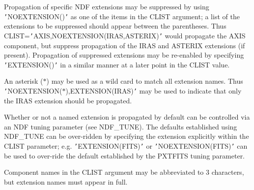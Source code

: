 \documentclass[twoside,11pt,nolof]{starlink}
\begin{document}
{{{         \sstitem
         Propagation of specific NDF extensions may be suppressed by
         using \texttt{'}NOEXTENSION()\texttt{'} as one of the items in the CLIST argument;
         a list of the extensions to be suppressed should appear between
         the parentheses. Thus CLIST=\texttt{'}AXIS,NOEXTENSION(IRAS,ASTERIX)\texttt{'}
         would propagate the AXIS component, but suppress propagation of
         the IRAS and ASTERIX extensions (if present). Propagation of
         suppressed extensions may be re-enabled by specifying
         \texttt{'}EXTENSION()\texttt{'} in a similar manner at a later point in the CLIST
         value.

         \sstitem An asterisk ($*$) may be used as a wild card to match all
         extension names. Thus \texttt{'}NOEXTENSION($*$),EXTENSION(IRAS)\texttt{'}
         may be used to indicate that only the IRAS extension should be
         propagated.

         \sstitem
         Whether or not a named extension is propagated by default can be
         controlled via an NDF tuning parameter (see NDF\_TUNE). The defaults
         established using NDF\_TUNE can be over-ridden by specifying the
         extension explicitly within the CLIST parameter; e.g.
         \texttt{'}EXTENSION(FITS)\texttt{'} or \texttt{'}NOEXTENSION(FITS)\texttt{'} can be used to over-ride
         the default established by the PXTFITS tuning parameter.

         \sstitem
         Component names in the CLIST argument may be abbreviated to 3
         characters, but extension names must appear in full.
      }
   }
}
\end{document}
